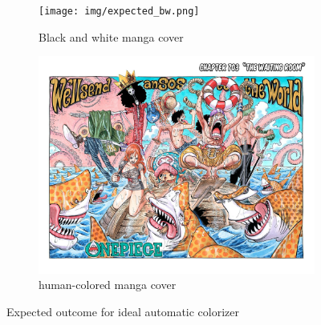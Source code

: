 \begin{figure}[htbp]
    \centering
    \begin{subfigure}[b]{0.48\textwidth}
        \texttt{[image: img/expected\_bw.png]}
        \caption{Black and white manga cover}
      
    \end{subfigure}
    \hfill
    \begin{subfigure}[b]{0.48\textwidth}
        \includegraphics[width=\textwidth]{img/expected_human-drawn_ideal.png}
        \caption{human-colored manga cover}

    \end{subfigure}
    
\caption{Expected outcome for ideal automatic colorizer}
\label{fig:bad_images}
    
\end{figure}
\pagebreak